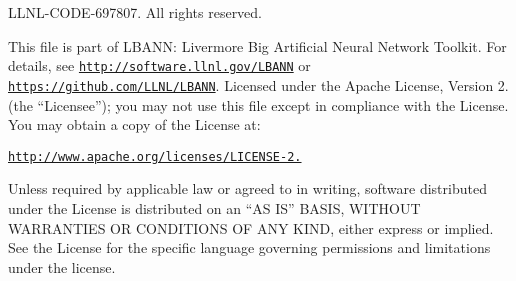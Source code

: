 L\+L\+N\+L-\/\+C\+O\+D\+E-\/697807. All rights reserved.

This file is part of L\+B\+A\+NN\+: Livermore Big Artificial Neural Network Toolkit. For details, see \href{http://software.llnl.gov/LBANN}{\tt http\+://software.\+llnl.\+gov/\+L\+B\+A\+NN} or \href{https://github.com/LLNL/LBANN}{\tt https\+://github.\+com/\+L\+L\+N\+L/\+L\+B\+A\+NN}. Licensed under the Apache License, Version 2. (the “\+Licensee”); you may not use this file except in compliance with the License. You may obtain a copy of the License at\+:

\href{http://www.apache.org/licenses/LICENSE-2.0}{\tt http\+://www.\+apache.\+org/licenses/\+L\+I\+C\+E\+N\+S\+E-\/2.}

Unless required by applicable law or agreed to in writing, software distributed under the License is distributed on an “\+AS I\+S” B\+A\+S\+IS, W\+I\+T\+H\+O\+UT W\+A\+R\+R\+A\+N\+T\+I\+ES OR C\+O\+N\+D\+I\+T\+I\+O\+NS OF A\+NY K\+I\+ND, either express or implied. See the License for the specific language governing permissions and limitations under the license. 